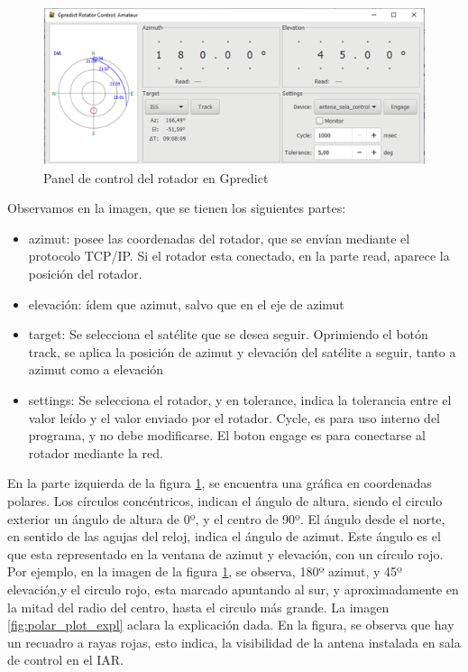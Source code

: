 \vspace{20mm}
\begin{figure}[ht]
	\includegraphics{rotador_select}
	\caption{Panel de control del rotador en Gpredict}
	\label{fig:panel_control_gpr}
\end{figure}

Observamos en la imagen, que se tienen los siguientes partes: 

\begin{itemize}	
	\item azimut: posee las coordenadas del rotador, que se envían mediante el protocolo TCP/IP. Si el rotador esta conectado, en la parte read, aparece la posición del rotador.  
	\item elevación: ídem que azimut, salvo que en el eje de azimut  
	\item target: Se selecciona el satélite que se desea seguir. Oprimiendo el botón track, se aplica la posición de azimut y elevación del satélite a seguir, tanto a azimut como a elevación 
	\item settings: Se selecciona el rotador, y en tolerance, indica la tolerancia entre el valor leído y el valor enviado por el rotador. Cycle, es para uso interno del programa, y no debe modificarse. El boton engage es para conectarse al rotador mediante la red.   
\end{itemize}


En la parte izquierda de la figura \ref{fig:panel_control_gpr}, se encuentra una gráfica en coordenadas polares. Los círculos concéntricos, indican el ángulo de altura, siendo el circulo exterior un ángulo de altura de 0º, y el centro de 90º. El ángulo desde el norte, en sentido de las agujas del reloj, indica el ángulo de azimut. Este ángulo es el que esta representado en la ventana de azimut y elevación, con un círculo rojo. Por ejemplo, en la imagen de la figura \ref{fig:panel_control_gpr}, se observa, 180º azimut, y 45º elevación,y el circulo rojo, esta marcado apuntando al sur, y aproximadamente en la mitad del radio del centro, hasta el circulo más grande. La imagen \ref{fig:polar_plot_expl} aclara la explicación dada. En la figura, se observa que hay un recuadro a rayas rojas, esto indica, la visibilidad de la antena instalada en sala de control en el IAR. 


